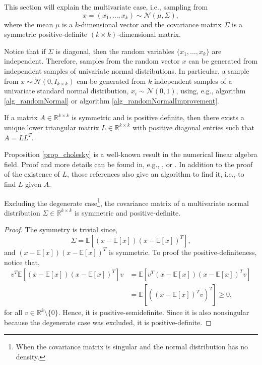 This section will explain the multivariate case, i.e., sampling from
$$
  x = (x_1, \dots, x_k) \sim \mathcal{N}(\mu, \Sigma),
$$ 
where the mean $\mu$ is a $k$-dimensional vector and the covariance matrix $\Sigma$ is a symmetric positive\hyp{}definite $(k \times k)$-dimensional matrix.

\begin{remark} \label{remark_univariateToMultivariate}
  Notice that if $\Sigma$ is diagonal, then the random variables $\{x_1, \dots, x_k\}$ are independent. Therefore, samples from the random vector $x$ can be generated from independent samples of univariate normal distributions. In particular, a sample from $x \sim \mathcal{N}(0,I_{k \times k})$ can be generated from $k$ independent samples of a univariate standard normal distribution, $x_i \sim \mathcal{N}(0,1)$, using, e.g., algorithm \ref{alg_randomNormal} or algorithm \ref{alg_randomNormalImprovement}.
\end{remark}

\begin{proposition}  \label{prop_cholesky}
  If a matrix $A \in \mathbb{R}^{k \times k}$ is symmetric and is positive definite, then there exists a unique lower triangular matrix $L \in \mathbb{R}^{k \times k}$ with positive diagonal entries such that $A = LL^T$.
\end{proposition}

Proposition \ref{prop_cholesky} is a well-known result in the numerical linear algebra field. Proof and more details can be found in, e.g., \textcite{golub2013}, \textcite{trefethen1997} or \textcite{demmel1997}. In addition to the proof of the existence of $L$, those references also give an algorithm to find it, i.e., to find $L$ given $A$.

\begin{proposition} \label{prop_SigmaSPD}
  Excluding the degenerate case\footnote{When the covariance matrix is singular and the normal distribution has no density.}, the covariance matrix of a multivariate normal distribution $\Sigma \in \mathbb{R}^{k \times k}$ is symmetric and positive\hyp{}definite.
\begin{proof}
  The symmetry is trivial since,
  $$
    \Sigma = \mathbb{E}\left[ (x-\mathbb{E}[x])(x-\mathbb{E}[x])^T \right],
  $$
  and $(x-\mathbb{E}[x])(x-\mathbb{E}[x])^T$ is symmetric.
  To proof the positive\hyp{}definiteness, notice that,
  $$
   \begin{aligned}
    v^T \mathbb{E}\left[ (x-\mathbb{E}[x])(x-\mathbb{E}[x])^T \right] v 
       &= \mathbb{E}\left[ v^T (x-\mathbb{E}[x])(x-\mathbb{E}[x])^T v \right] \\
       &= \mathbb{E}\left[ \left( (x-\mathbb{E}[x])^T v \right)^2 \right]
       \geq 0,
   \end{aligned}
  $$
  for all $v \in \mathbb{R}^k \setminus \{0\}$. Hence, it is positive-semidefinite. Since it is also nonsingular because the degenerate case was excluded, it is positive\hyp{}definite.
\end{proof}
\end{proposition}

